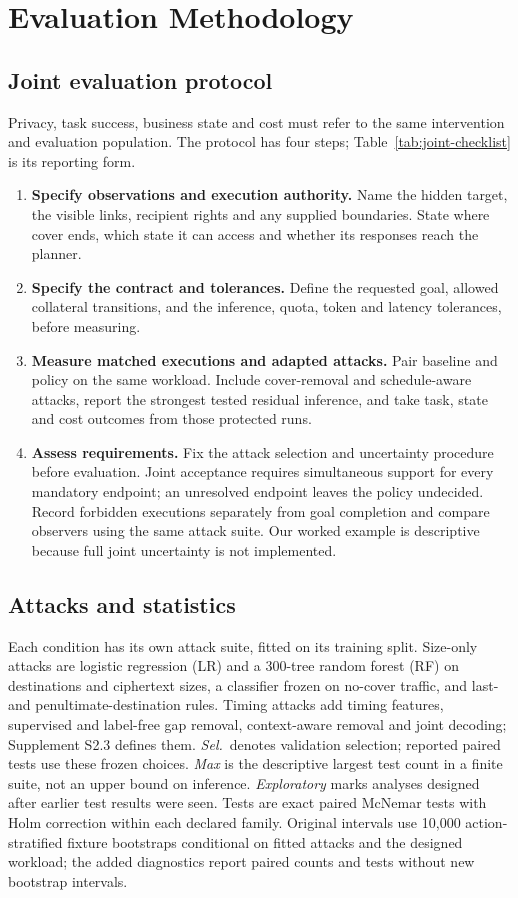 \section{Evaluation Methodology}\label{sec:method}
\subsection{Joint evaluation protocol}
Privacy, task success, business state and cost must refer to the same intervention and evaluation population. The protocol has four steps; Table~\ref{tab:joint-checklist} is its reporting form.
\begin{enumerate}
\item \textbf{Specify observations and execution authority.} Name the hidden target, the visible links, recipient rights and any supplied boundaries. State where cover ends, which state it can access and whether its responses reach the planner.
\item \textbf{Specify the contract and tolerances.} Define the requested goal, allowed collateral transitions, and the inference, quota, token and latency tolerances, before measuring.
\item \textbf{Measure matched executions and adapted attacks.} Pair baseline and policy on the same workload. Include cover-removal and schedule-aware attacks, report the strongest tested residual inference, and take task, state and cost outcomes from those protected runs.
\item \textbf{Assess requirements.} Fix the attack selection and uncertainty procedure before evaluation. Joint acceptance requires simultaneous support for every mandatory endpoint; an unresolved endpoint leaves the policy undecided. Record forbidden executions separately from goal completion and compare observers using the same attack suite. Our worked example is descriptive because full joint uncertainty is not implemented.
\end{enumerate}



\subsection{Attacks and statistics}\label{sec:stats}
Each condition has its own attack suite, fitted on its training split. Size-only attacks are logistic regression (LR) and a 300-tree random forest (RF) on destinations and ciphertext sizes, a classifier frozen on no-cover traffic, and last- and penultimate-destination rules. Timing attacks add timing features, supervised and label-free gap removal, context-aware removal and joint decoding; Supplement S2.3 defines them. \emph{Sel.}\ denotes validation selection; reported paired tests use these frozen choices. \emph{Max} is the descriptive largest test count in a finite suite, not an upper bound on inference. \emph{Exploratory} marks analyses designed after earlier test results were seen. Tests are exact paired McNemar tests with Holm correction within each declared family. Original intervals use 10,000 action-stratified fixture bootstraps conditional on fitted attacks and the designed workload; the added diagnostics report paired counts and tests without new bootstrap intervals.

